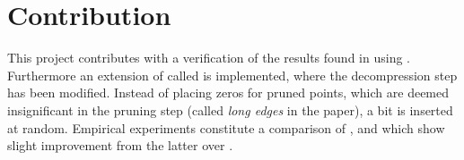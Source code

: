 \section{Contribution}
\label{contribution}
This project contributes with a verification of the results found in \cite{wagner17} using \qs{}. Furthermore an extension of \qs{} called \qsr{} is implemented, where the decompression step has been modified. Instead of placing zeros for pruned points, which are deemed insignificant in the pruning step (called \textit{long edges} in the paper), a bit is inserted at random. Empirical experiments constitute a comparison of \qs{}, \grid{} and \qsr{} which show slight improvement from the latter over \qs{}.


